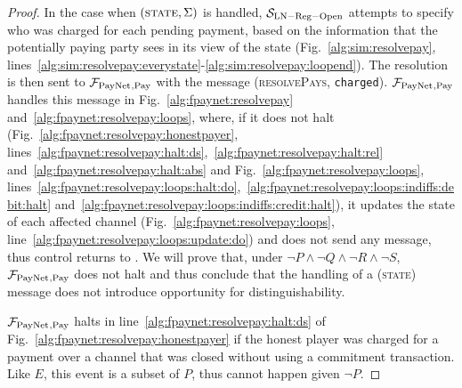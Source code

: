 \begin{proof}
  In the case when $\left(\textsc{state}, \Sigma\right)$ is handled,
  $\mathcal{S}_{\mathrm{LN - Reg - Open}}$ attempts to specify who was charged
  for each pending payment, based on the information that the potentially paying
  party sees in its view of the \ledger{} state (Fig.~\ref{alg:sim:resolvepay},
  lines~\ref{alg:sim:resolvepay:everystate}-\ref{alg:sim:resolvepay:loopend}).
  The resolution is then sent to $\mathcal{F}_{\mathrm{PayNet}}{}_{\mathrm{, Pay}}$ with the message
  (\textsc{resolvePays}, \texttt{charged}). $\mathcal{F}_{\mathrm{PayNet}}{}_{\mathrm{, Pay}}$
  handles this message in Fig.~\ref{alg:fpaynet:resolvepay}
  and~\ref{alg:fpaynet:resolvepay:loops}, where, if it does not halt
  (Fig.~\ref{alg:fpaynet:resolvepay:honestpayer},
  lines~\ref{alg:fpaynet:resolvepay:halt:ds},~\ref{alg:fpaynet:resolvepay:halt:rel}
  and~\ref{alg:fpaynet:resolvepay:halt:abs} and
  Fig.~\ref{alg:fpaynet:resolvepay:loops},
  lines~\ref{alg:fpaynet:resolvepay:loops:halt:do},~\ref{alg:fpaynet:resolvepay:loops:indiffs:debit:halt}
  and~\ref{alg:fpaynet:resolvepay:loops:indiffs:credit:halt}), it updates the
  state of each affected channel (Fig.~\ref{alg:fpaynet:resolvepay:loops},
  line~\ref{alg:fpaynet:resolvepay:loops:update:do}) and does not send any
  message, thus control returns to \environment. We will prove that, under $\neg
  P \wedge \neg Q \wedge \neg R \wedge \neg S$, $\mathcal{F}_{\mathrm{PayNet}}{}_{\mathrm{, Pay}}$
  does not halt and thus conclude that the handling of a (\textsc{state})
  message does not introduce opportunity for distinguishability.

  $\mathcal{F}_{\mathrm{PayNet}}{}_{\mathrm{, Pay}}$ halts in
  line~\ref{alg:fpaynet:resolvepay:halt:ds} of
  Fig.~\ref{alg:fpaynet:resolvepay:honestpayer} if the honest player \dave{} was
  charged for a payment over a channel that was closed without using a
  commitment transaction. Like $E$, this event is a subset of $P$, thus cannot
  happen given $\neg P$.


\end{proof}
